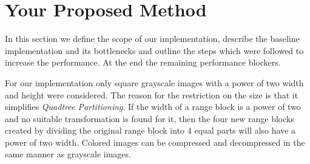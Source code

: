 \section{Your Proposed Method}\label{sec:yourmethod}






In this section we define the scope of our implementation, describe the baseline
implementation and its bottlenecks and outline the steps which were followed to
increase the performance. At the end the remaining performance blockers.

 For our implementation only square grayscale images with a power
of two width and height were considered. The reason for the restriction on the
size is that it simplifies \textit{Quadtree Partitioning}. If the width of a
range block is a power of two and no suitable transformation is found for it,
then the four new range blocks created by dividing the original range block into
4 equal parts will also have a power of two width. Colored images can be
compressed and decompressed in the same manner as grayscale images.

